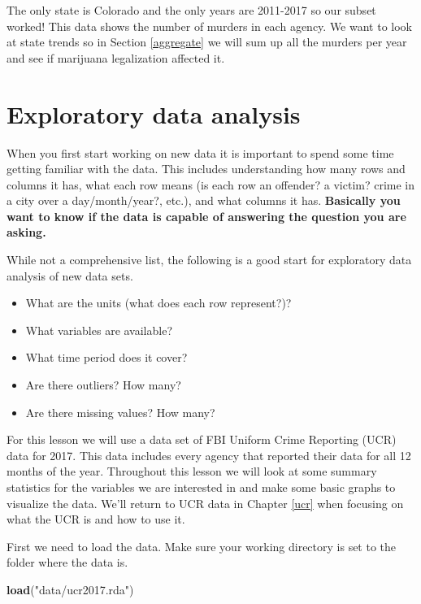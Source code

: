 \documentclass[
  12pt,
]{book}
\newenvironment{Shaded}{\begin{snugshade}}{\end{snugshade}}
\newcommand{\KeywordTok}[1]{\textcolor[rgb]{0.13,0.29,0.53}{\textbf{#1}}}
\newcommand{\NormalTok}[1]{#1}
\newcommand{\StringTok}[1]{\textcolor[rgb]{0.31,0.60,0.02}{#1}}
\providecommand{\tightlist}{%
  \setlength{\itemsep}{0pt}\setlength{\parskip}{0pt}}
\begin{document}
The only state is Colorado and the only years are 2011-2017 so our subset worked! This data shows the number of murders in each agency. We want to look at state trends so in Section \ref{aggregate} we will sum up all the murders per year and see if marijuana legalization affected it.

\hypertarget{explore}{%
\chapter{Exploratory data analysis}\label{explore}}

When you first start working on new data it is important to spend some time getting familiar with the data. This includes understanding how many rows and columns it has, what each row means (is each row an offender? a victim? crime in a city over a day/month/year?, etc.), and what columns it has. \textbf{Basically you want to know if the data is capable of answering the question you are asking.}

While not a comprehensive list, the following is a good start for exploratory data analysis of new data sets.

\begin{itemize}
\tightlist
\item
  What are the units (what does each row represent?)?
\item
  What variables are available?
\item
  What time period does it cover?
\item
  Are there outliers? How many?
\item
  Are there missing values? How many?
\end{itemize}

For this lesson we will use a data set of FBI Uniform Crime Reporting (UCR) data for 2017. This data includes every agency that reported their data for all 12 months of the year. Throughout this lesson we will look at some summary statistics for the variables we are interested in and make some basic graphs to visualize the data. We'll return to UCR data in Chapter \ref{ucr} when focusing on what the UCR is and how to use it.

First we need to load the data. Make sure your working directory is set to the folder where the data is.

\begin{Shaded}
\begin{Highlighting}[]
\KeywordTok{load}\NormalTok{(}\StringTok{"data/ucr2017.rda"}\NormalTok{)}
\end{Highlighting}
\end{Shaded}
\end{document}
